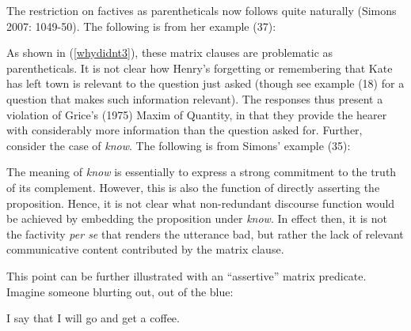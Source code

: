 \documentclass[output=paper]{LSP/langsci}
\begin{document}
The restriction on factives as parentheticals now follows quite naturally (Simons 2007: 1049-50). The following is from her example (37):%
\begin{exe}
	\ex \begin{xlist}
	\end{xlist} \label{whydidnt3}
\end{exe}

As shown in (\ref{whydidnt3}), these matrix clauses are problematic as parentheticals. %
It is not clear how Henry's forgetting or remembering that Kate has left town is relevant to the question just asked (though see example (18) for a question that makes such information relevant). The responses thus present a violation of Grice's (1975) Maxim of Quantity, in that they provide the hearer with considerably more information than the question asked for. Further, consider the case of \textit{know}. The following is from Simons' example (35): %
\begin{exe}
		\ex \begin{xlist}
	\end{xlist} \label{wherewas2}
\end{exe}

The meaning of \textit{know} is essentially to express a strong commitment to the truth of its complement. However, this is also the function of directly asserting the proposition. Hence, it is not clear what non-redundant discourse function would be achieved by embedding the proposition under \textit{know}. In effect then, it is not the factivity \textit{per se} that renders the utterance bad, but rather the lack of relevant communicative content contributed by the matrix clause. 

This point can be further illustrated with an ``assertive'' matrix predicate. Imagine someone blurting out, out of the blue:
\begin{exe}
	\ex I say that I will go and get a coffee. \label{isay}
\end{exe}
\end{document}
